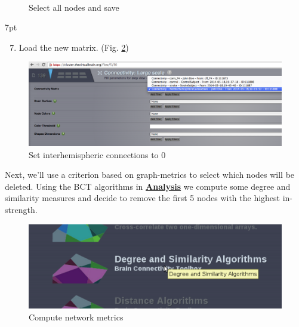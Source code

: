 \documentclass{tufte-handout}
\newenvironment{formal}{%
  \def\FrameCommand{%
    \hspace{1pt}%
    {\color{DarkBlue}\vrule width 2pt}%
    {\color{formalshade}\vrule width 4pt}%
    \colorbox{formalshade}%
  }%
  \MakeFramed{\advance\hsize-\width\FrameRestore}%
  \noindent\hspace{-4.55pt}%
  \begin{adjustwidth}{}{7pt}%
  \vspace{2pt}\vspace{2pt}%
}
{%
  \vspace{2pt}\end{adjustwidth}\endMakeFramed%
}
\begin{document}
\begin{figure}%
  \\
  \caption{Select all nodes and save}
  \label{fig:steps_save}
\end{figure}


\begin{formal}
  \begin{enumerate}[resume]
  \setcounter{enumi}{6}
    \item Load the new matrix. (Fig. \ref{fig:steps_07})
  \end{enumerate}
\end{formal}

\begin{figure}[h]
  \includegraphics[width=\linewidth]{Handout_UI_ModellingStructuralLesions_LoadNewMatrix}%
  \caption{Set interhemispheric connections to 0}%
  \label{fig:steps_07}%
\end{figure}

\noindent Next, we'll use a criterion based on graph-metrics to select which
nodes will be deleted. Using the BCT 
algorithms in \underline{\textbf{Analysis}} we compute some degree and
similarity measures and decide to remove the first 5 nodes with the highest
in-strength.


\begin{figure}[h]
  \includegraphics[width=\linewidth]{Handout_UI_ModellingStructuralLesions_Analysis}%
  \caption{Compute network metrics}%
  \label{fig:step_01}%
\end{figure}
\end{document}
